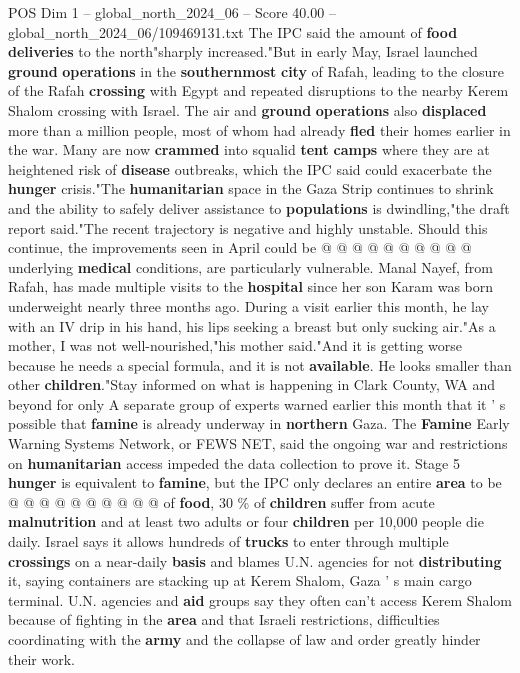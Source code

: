 \begin{textsample}{POS Dim 1 – global\_north\_2024\_06 – Score 40.00 – global\_north\_2024\_06/109469131.txt}
The IPC said the amount of \textbf{food} \textbf{deliveries} to the north"sharply increased."But in early May, Israel launched \textbf{ground} \textbf{operations} in the \textbf{southernmost} \textbf{city} of Rafah, leading to the closure of the Rafah \textbf{crossing} with Egypt and repeated disruptions to the nearby Kerem Shalom crossing with Israel.
The air and \textbf{ground} \textbf{operations} also \textbf{displaced} more than a million people, most of whom had already \textbf{fled} their homes earlier in the war.
Many are now \textbf{crammed} into squalid \textbf{tent} \textbf{camps} where they are at heightened risk of \textbf{disease} outbreaks, which the IPC said could exacerbate the \textbf{hunger} crisis."The \textbf{humanitarian} space in the Gaza Strip continues to shrink and the ability to safely deliver assistance to \textbf{populations} is dwindling,"the draft report said."The recent trajectory is negative and highly unstable.
Should this continue, the improvements seen in April could be @ @ @ @ @ @ @ @ @ @ underlying \textbf{medical} conditions, are particularly vulnerable.
Manal Nayef, from Rafah, has made multiple visits to the \textbf{hospital} since her son Karam was born underweight nearly three months ago.
During a visit earlier this month, he lay with an IV drip in his hand, his lips seeking a breast but only sucking air."As a mother, I was not well-nourished,"his mother said."And it is getting worse because he needs a special formula, and it is not \textbf{available}.
He looks smaller than other \textbf{children}."Stay informed on what is happening in Clark County, WA and beyond for only A separate group of experts warned earlier this month that it ' s possible that \textbf{famine} is already underway in \textbf{northern} Gaza.
The \textbf{Famine} Early Warning Systems Network, or FEWS NET, said the ongoing war and restrictions on \textbf{humanitarian} access impeded the data collection to prove it.
Stage 5 \textbf{hunger} is equivalent to \textbf{famine}, but the IPC only declares an entire \textbf{area} to be @ @ @ @ @ @ @ @ @ @ of \textbf{food}, 30 \% of \textbf{children} suffer from acute \textbf{malnutrition} and at least two adults or four \textbf{children} per 10,000 people die daily.
Israel says it allows hundreds of \textbf{trucks} to enter through multiple \textbf{crossings} on a near-daily \textbf{basis} and blames U.N. agencies for not \textbf{distributing} it, saying containers are stacking up at Kerem Shalom, Gaza ' s main cargo terminal.
U.N. agencies and \textbf{aid} groups say they often can't access Kerem Shalom because of fighting in the \textbf{area} and that Israeli restrictions, difficulties coordinating with the \textbf{army} and the collapse of law and order greatly hinder their work.

\end{textsample}
